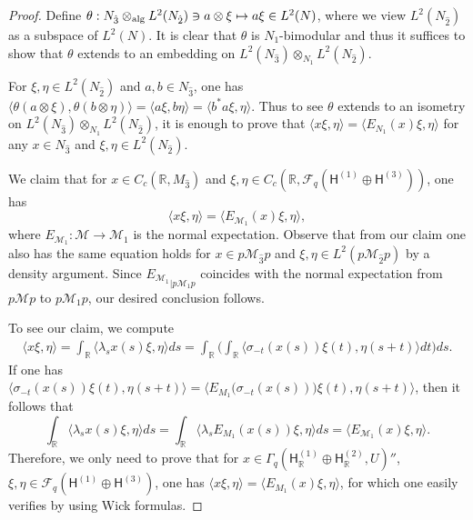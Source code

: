 \documentclass[a4paper,11pt]{amsart}
\theoremstyle{definition}
\newcommand{\R}{{\mathbb R}}
\newcommand{\cF}{{\mathcal F}}
\newcommand{\cM}{{\mathcal M}}
\newcommand{\sH}{\mathsf{H}}
\newcommand{\ot}{\otimes}
\begin{document}
\begin{proof}
Define $\theta: N_{\hat 3}\ot_{\rm alg} L^2(N_{\hat 2})\ni a\ot \xi \mapsto a\xi\in L^2(N)$,
	where we view $L^2(N_{\hat 2})$ as a subspace of $L^2(N)$.
It is clear that $\theta$ is $N_1$-bimodular 
	and thus it suffices to show that $\theta$ extends to an embedding on $L^2(N_{\hat 3 })\ot_{ N_{1} } L^2(N_{\hat 2})$.

	
For $\xi, \eta\in L^2(N_{\hat 2})$ and $a,b\in N_{\hat 3}$, one has
	$\langle \theta(a\ot \xi), \theta(b\ot \eta)\rangle=\langle a\xi, b\eta\rangle=\langle b^*a \xi, \eta\rangle$.
Thus to see $\theta$ extends to an isometry on $L^2(N_{\hat 3 })\ot_{ N_{1} } L^2(N_{\hat 2})$, 
	it is enough to prove that 
	$\langle x \xi, \eta\rangle=\langle E_{N_{1}}(x)\xi, \eta\rangle$ for any $x\in N_{\hat 3}$ and $\xi,\eta\in L^2(N_{\hat 2})$.

We claim that for $x\in C_c(\R, M_{\hat 3})$ and $\xi,\eta\in C_c(\R, \cF_q(\sH^{(1)}\oplus \sH^{(3)}))$, 
	one has
$$
\langle x\xi, \eta\rangle=\langle E_{\cM_1}(x)\xi,\eta\rangle,
$$
where $E_{\cM_1}: \cM\to \cM_1$ is the normal expectation.
Observe that from our claim one also has the same equation holds for $x\in p\cM_{\hat 3} p$
	and $\xi,\eta \in L^2(p\cM_{\hat 2} p)$ by a density argument.
Since ${E_{\cM_1}}_{\mid p\cM_1 p}$ coincides with the normal expectation from $p\cM p$ to $p\cM_1 p$,
	our desired conclusion follows.

To see our claim, we compute
\[
\begin{aligned}
\langle x\xi, \eta\rangle=\int_\R \langle \lambda_sx(s)\xi,\eta\rangle ds
	=\int_\R \Big(\int_\R \langle \sigma_{-t}(x(s))\xi(t),\eta(s+t)\rangle dt \Big)ds.
\end{aligned}
\]
If one has $\langle \sigma_{-t}(x(s))\xi(t),\eta(s+t)\rangle=\langle E_{M_1}\big (\sigma_{-t}(x(s))\big)\xi(t), \eta(s+t)\rangle$,
	then it follows that 
$$
\int_\R \langle \lambda_sx(s)\xi,\eta\rangle ds=\int_\R \langle \lambda_s E_{M_1}(x(s))\xi,\eta\rangle ds=\langle E_{\cM_1}(x)\xi,\eta\rangle.
$$
Therefore, we only need to prove that for $x\in \Gamma_q(\sH_\R^{(1)}\oplus \sH_\R^{(2)}, U)''$, $\xi,\eta\in \cF_q(\sH^{(1)}\oplus \sH^{(3)})$,
	one has $\langle x\xi,\eta\rangle=\langle E_{M_1}(x)\xi,\eta\rangle$, for which one easily verifies by using Wick formulas.
\end{proof}
\end{document}
